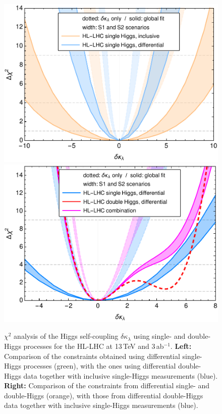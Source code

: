 \begin{figure}
	\centering
	\includegraphics[width=0.45\linewidth]{section3/plots/HLinclusive}\hfill
	\includegraphics[width=0.45\linewidth]{section3/plots/HLdifferential}
	\caption{$\chi^2$ analysis of the Higgs self-coupling $\delta \kappa_\lambda$ using single- and double-Higgs processes for the HL-LHC at 13\,TeV and 3\,ab$^{-1}$. \textbf{Left:} Comparison of the constraints obtained using differential single-Higgs processes (green), with the ones using differential double-Higgs data together with inclusive single-Higgs measurements (blue). \textbf{Right:} Comparison of the constraints from differential single- and double-Higgs (orange), with those from differential double-Higgs data together with inclusive single-Higgs measurements (blue).}
	\label{fig:hllhcchi2}
\end{figure}

